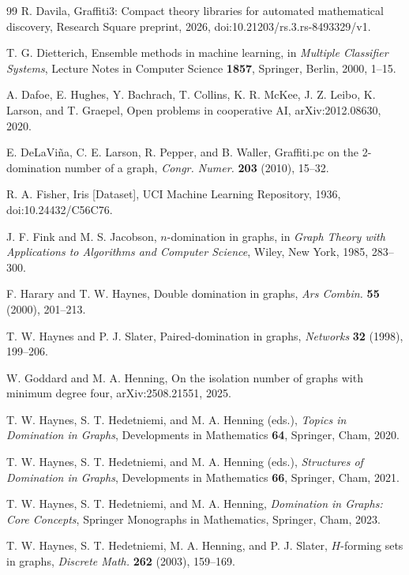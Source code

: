 \documentclass[11pt]{article}
\theoremstyle{definition}
\theoremstyle{remark}
\begin{document}
\begin{thebibliography}{99}
R. Davila,
Graffiti3: Compact theory libraries for automated mathematical discovery,
Research Square preprint, 2026, doi:10.21203/rs.3.rs-8493329/v1.

T. G. Dietterich,
Ensemble methods in machine learning,
in \emph{Multiple Classifier Systems},
Lecture Notes in Computer Science \textbf{1857}, Springer, Berlin, 2000,
1--15.

A. Dafoe, E. Hughes, Y. Bachrach, T. Collins, K. R. McKee, J. Z. Leibo,
K. Larson, and T. Graepel,
Open problems in cooperative AI,
arXiv:2012.08630, 2020.

E. DeLaVi\~na, C. E. Larson, R. Pepper, and B. Waller,
Graffiti.pc on the 2-domination number of a graph,
\emph{Congr. Numer.} \textbf{203} (2010), 15--32.

R. A. Fisher,
Iris [Dataset],
UCI Machine Learning Repository, 1936,
doi:10.24432/C56C76.

J. F. Fink and M. S. Jacobson,
\(n\)-domination in graphs,
in \emph{Graph Theory with Applications to Algorithms and Computer Science},
Wiley, New York, 1985, 283--300.

F. Harary and T. W. Haynes,
Double domination in graphs,
\emph{Ars Combin.} \textbf{55} (2000), 201--213.

T. W. Haynes and P. J. Slater,
Paired-domination in graphs,
\emph{Networks} \textbf{32} (1998), 199--206.

W. Goddard and M. A. Henning,
On the isolation number of graphs with minimum degree four,
arXiv:2508.21551, 2025.

T. W. Haynes, S. T. Hedetniemi, and M. A. Henning (eds.),
\emph{Topics in Domination in Graphs},
Developments in Mathematics \textbf{64}, Springer, Cham, 2020.

T. W. Haynes, S. T. Hedetniemi, and M. A. Henning (eds.),
\emph{Structures of Domination in Graphs},
Developments in Mathematics \textbf{66}, Springer, Cham, 2021.

T. W. Haynes, S. T. Hedetniemi, and M. A. Henning,
\emph{Domination in Graphs: Core Concepts},
Springer Monographs in Mathematics, Springer, Cham, 2023.

T. W. Haynes, S. T. Hedetniemi, M. A. Henning, and P. J. Slater,
\(H\)-forming sets in graphs,
\emph{Discrete Math.} \textbf{262} (2003), 159--169.


\end{thebibliography}
\end{document}
